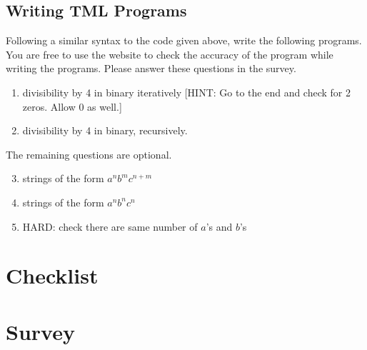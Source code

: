 \subsection{Writing TML Programs}

Following a similar syntax to the code given above, write the following programs. You are free to use the website to check the accuracy of the program while writing the programs. Please answer these questions in the survey.
\begin{enumerate}
    \item divisibility by 4 in binary iteratively [HINT: Go to the end and check for 2 zeros. Allow 0 as well.]
    \item divisibility by 4 in binary, recursively.
\end{enumerate}
    
The remaining questions are optional. 
\begin{enumerate}
    \setcounter{enumi}{2}
    \item strings of the form $a^n b^m c^{n+m}$
    \item strings of the form $a^n b^n c^n$
    \item HARD: check there are same number of $a$'s and $b$'s
\end{enumerate}

\section{Checklist}
\section{Survey}

